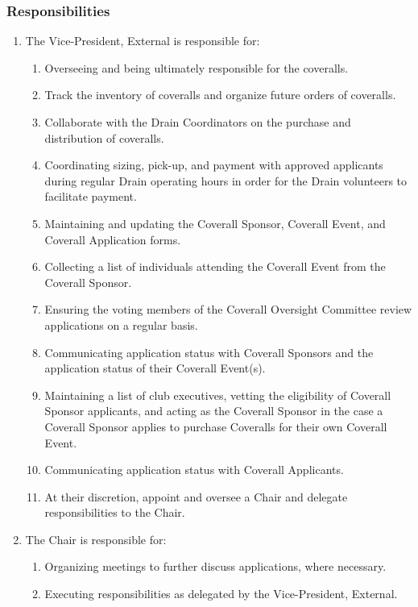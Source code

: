 \subsubsection{Responsibilities}
\label{coverall-responsibilities}
\begin{enumerate}
 \item
  The Vice-President, External is responsible for:
  \begin{enumerate}
   \item
    Overseeing and being ultimately responsible for the coveralls.
   \item
    Track the inventory of coveralls and organize future orders of coveralls.
   \item
    Collaborate with the Drain Coordinators on the purchase and distribution of coveralls.
   \item
    Coordinating sizing, pick-up, and payment with approved applicants during regular Drain operating hours in order for the Drain volunteers to facilitate payment.
   \item
    Maintaining and updating the Coverall Sponsor, Coverall Event, and Coverall Application forms.
   \item
    Collecting a list of individuals attending the Coverall Event from the Coverall Sponsor.
   \item
    Ensuring the voting members of the Coverall Oversight Committee review applications on a regular basis.
   \item
    Communicating application status with Coverall Sponsors and the application status of their Coverall Event(s).
   \item
    Maintaining a list of club executives, vetting the eligibility of Coverall Sponsor applicants, and acting as the Coverall Sponsor in the case a Coverall Sponsor applies to purchase Coveralls for their own Coverall Event.
   \item
    Communicating application status with Coverall Applicants.
   \item
    At their discretion, appoint and oversee a Chair and delegate responsibilities to the Chair.
  \end{enumerate}
 \item
  The Chair is responsible for:
  \begin{enumerate}
   \item
    Organizing meetings to further discuss applications, where necessary.
   \item Executing responsibilities as delegated by the Vice-President, External.
  \end{enumerate}
\end{enumerate}
